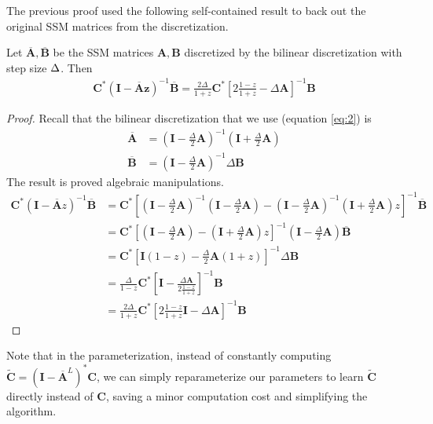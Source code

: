 The previous proof used the following self-contained result to back out the original SSM matrices from the discretization.
\begin{lemma}%
  \label{lmm:bilinear-resolvent}
  Let \( \bm{\overline{A}}, \bm{\overline{B}} \) be the SSM matrices \( \bm{A}, \bm{B} \) discretized by the bilinear discretization with step size \( \Delta \). Then
  \begin{align*}
    \bm{C}^*\left(\bm{I} - \bm{\overline{A}z} \right)^{-1} \bm{\overline{B}}
    =
    \frac{2\Delta}{1+z} \bm{C}^* \left[ {2 \frac{1-z}{1+z}} - \Delta \bm{A} \right]^{-1} \bm{B}
  \end{align*}
\end{lemma}
\begin{proof}%
  Recall that the bilinear discretization that we use (equation \eqref{eq:2}) is
  \begin{align*}
    \bm{\overline{A}}
    &=
    \left(\bm{I} - \frac{\Delta}{2} \bm{A}\right)^{-1} \left(\bm{I} + \frac{\Delta}{2} \bm{A}\right)
    \\
    \bm{\overline{B}} &= \left(\bm{I} - \frac{\Delta}{2} \bm{A}\right)^{-1} \Delta \bm{B}
  \end{align*}
  The result is proved algebraic manipulations.
  \begin{align*}
    \bm{C}^*\left(\bm{I} - \bm{\overline{A}} z\right)^{-1} \bm{\overline{B}}
    &=
    \bm{C}^* \left[ \left(\bm{I} - \frac{\Delta}{2} \bm{A}\right)^{-1}\left(\bm{I} - \frac{\Delta}{2} \bm{A}\right)  - \left(\bm{I} - \frac{\Delta}{2} \bm{A}\right)^{-1} \left(\bm{I} + \frac{\Delta}{2} \bm{A}\right) z \right]^{-1} \bm{\overline{B}}
    \\&=
    \bm{C}^* \left[ \left(\bm{I} - \frac{\Delta}{2} \bm{A}\right) - \left(\bm{I} + \frac{\Delta}{2} \bm{A}\right) z \right]^{-1} \left(\bm{I} - \frac{\Delta}{2} \bm{A}\right) \bm{\overline{B}}
    \\&=
    \bm{C}^* \left[ \bm{I}(1 - z) - \frac{\Delta}{2} \bm{A} (1+z) \right]^{-1} \Delta\bm{B}
    \\&=
    \frac{\Delta}{1-z} \bm{C}^* \left[ \bm{I} - \frac{\Delta \bm{A}}{2 \frac{1-z}{1+z}} \right]^{-1} \bm{B}
    \\&=
    \frac{2\Delta}{1+z} \bm{C}^* \left[ {2 \frac{1-z}{1+z}} \bm{I} - \Delta \bm{A} \right]^{-1} \bm{B}
  \end{align*}
\end{proof}

Note that in the \methodabbrv{} parameterization, instead of constantly computing \( \bm{\tilde{C}} = \left(\bm{I} - \bm{\overline{A}}^L\right)^* \bm{C} \),
we can simply reparameterize our parameters to learn \( \bm{\tilde{C}} \) directly instead of \( \bm{C} \),
saving a minor computation cost and simplifying the algorithm.


